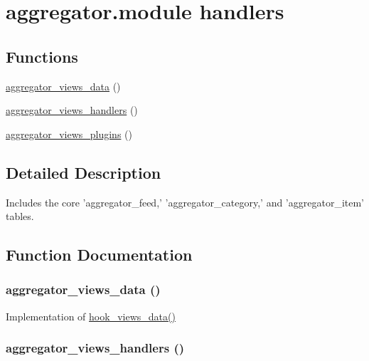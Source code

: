 \hypertarget{group__views__aggregator__module}{
\section{aggregator.module handlers}
\label{group__views__aggregator__module}
}
\subsection*{Functions}
\begin{CompactItemize}
\item 
\hyperlink{group__views__aggregator__module_g2a3f8960770694f1a6d3c0e2d7e24119}{aggregator\_\-views\_\-data} ()
\item 
\hyperlink{group__views__aggregator__module_g337e78cf30439d09694614deb0e1dab0}{aggregator\_\-views\_\-handlers} ()
\item 
\hyperlink{group__views__aggregator__module_g1260b78865a34f57c44780293ea022b2}{aggregator\_\-views\_\-plugins} ()
\end{CompactItemize}


\subsection{Detailed Description}
Includes the core 'aggregator\_\-feed,' 'aggregator\_\-category,' and 'aggregator\_\-item' tables. 

\subsection{Function Documentation}
\hypertarget{group__views__aggregator__module_g2a3f8960770694f1a6d3c0e2d7e24119}{
\subsubsection[{aggregator\_\-views\_\-data}]{\setlength{\rightskip}{0pt plus 5cm}aggregator\_\-views\_\-data ()}}
\label{group__views__aggregator__module_g2a3f8960770694f1a6d3c0e2d7e24119}


Implementation of \hyperlink{group__views__hooks_g227057901681e4a33e33c199c7a8c989}{hook\_\-views\_\-data()} \hypertarget{group__views__aggregator__module_g337e78cf30439d09694614deb0e1dab0}{
\subsubsection[{aggregator\_\-views\_\-handlers}]{\setlength{\rightskip}{0pt plus 5cm}aggregator\_\-views\_\-handlers ()}}
\label{group__views__aggregator__module_g337e78cf30439d09694614deb0e1dab0}


